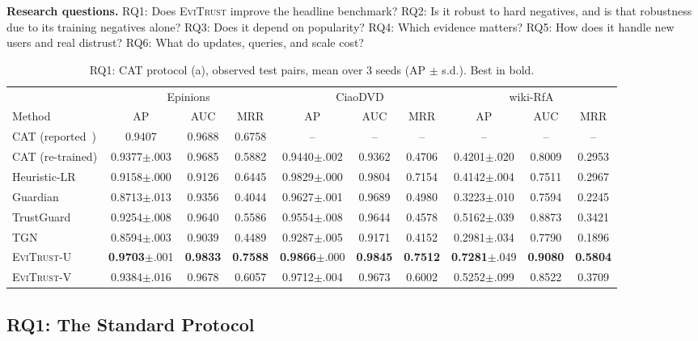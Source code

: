 \documentclass[conference]{IEEEtran}
\newcommand{\evi}{\textsc{EviTrust}}
\newcommand{\eviU}{\textsc{EviTrust}-U}
\newcommand{\eviV}{\textsc{EviTrust}-V}
\begin{document}
\textbf{Research questions.}
RQ1: Does \evi{} improve the headline benchmark?
RQ2: Is it robust to hard negatives, and is that robustness due to its training negatives alone?
RQ3: Does it depend on popularity?
RQ4: Which evidence matters?
RQ5: How does it handle new users and real distrust?
RQ6: What do updates, queries, and scale cost?

\begin{table}[t]
\centering
\caption{RQ1: CAT protocol (a), observed test pairs, mean over 3 seeds (AP $\pm$ s.d.). Best in bold.}
\label{tab:main}
\setlength{\tabcolsep}{5pt}
\begin{tabular}{l|ccc|ccc|ccc}
\toprule
& \multicolumn{3}{c|}{Epinions} & \multicolumn{3}{c|}{CiaoDVD} & \multicolumn{3}{c}{wiki-RfA} \\
Method & AP & AUC & MRR & AP & AUC & MRR & AP & AUC & MRR \\
\midrule
CAT (reported~\cite{wang2025cat}) & 0.9407 & 0.9688 & 0.6758 & -- & -- & -- & -- & -- & -- \\
CAT (re-trained) & 0.9377$\pm$.003 & 0.9685 & 0.5882 & 0.9440$\pm$.002 & 0.9362 & 0.4706 & 0.4201$\pm$.020 & 0.8009 & 0.2953 \\
Heuristic-LR & 0.9158$\pm$.000 & 0.9126 & 0.6445 & 0.9829$\pm$.000 & 0.9804 & 0.7154 & 0.4142$\pm$.004 & 0.7511 & 0.2967 \\
Guardian & 0.8713$\pm$.013 & 0.9356 & 0.4044 & 0.9627$\pm$.001 & 0.9689 & 0.4980 & 0.3223$\pm$.010 & 0.7594 & 0.2245 \\
TrustGuard & 0.9254$\pm$.008 & 0.9640 & 0.5586 & 0.9554$\pm$.008 & 0.9644 & 0.4578 & 0.5162$\pm$.039 & 0.8873 & 0.3421 \\
TGN & 0.8594$\pm$.003 & 0.9039 & 0.4489 & 0.9287$\pm$.005 & 0.9171 & 0.4152 & 0.2981$\pm$.034 & 0.7790 & 0.1896 \\
\midrule
\eviU{} & \textbf{0.9703}$\pm$.001 & \textbf{0.9833} & \textbf{0.7588} & \textbf{0.9866}$\pm$.000 & \textbf{0.9845} & \textbf{0.7512} & \textbf{0.7281}$\pm$.049 & \textbf{0.9080} & \textbf{0.5804} \\
\eviV{} & 0.9384$\pm$.016 & 0.9678 & 0.6057 & 0.9712$\pm$.004 & 0.9673 & 0.6002 & 0.5252$\pm$.099 & 0.8522 & 0.3709 \\
\bottomrule
\end{tabular}
\end{table}

\subsection{RQ1: The Standard Protocol}
\end{document}
